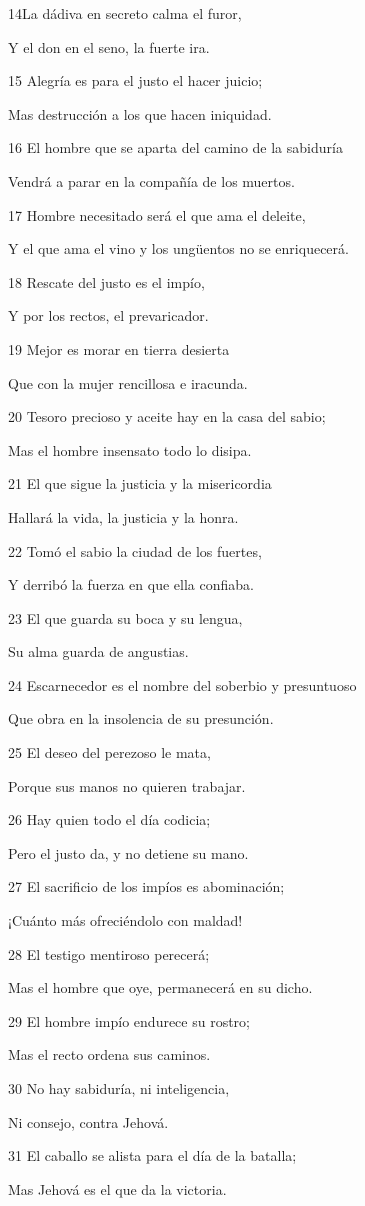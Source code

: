 \par 14La dádiva en secreto calma el furor,
\par Y el don en el seno, la fuerte ira.
\par 15 Alegría es para el justo el hacer juicio;
\par Mas destrucción a los que hacen iniquidad.
\par 16 El hombre que se aparta del camino de la sabiduría
\par Vendrá a parar en la compañía de los muertos.
\par 17 Hombre necesitado será el que ama el deleite,
\par Y el que ama el vino y los ungüentos no se enriquecerá. 
\par 18 Rescate del justo es el impío,
\par Y por los rectos, el prevaricador.
\par 19 Mejor es morar en tierra desierta
\par Que con la mujer rencillosa e iracunda.
\par 20 Tesoro precioso y aceite hay en la casa del sabio;
\par Mas el hombre insensato todo lo disipa.
\par 21 El que sigue la justicia y la misericordia
\par Hallará la vida, la justicia y la honra.
\par 22 Tomó el sabio la ciudad de los fuertes,
\par Y derribó la fuerza en que ella confiaba.
\par 23 El que guarda su boca y su lengua,
\par Su alma guarda de angustias.
\par 24 Escarnecedor es el nombre del soberbio y presuntuoso
\par Que obra en la insolencia de su presunción. 
\par 25 El deseo del perezoso le mata,
\par Porque sus manos no quieren trabajar.
\par 26 Hay quien todo el día codicia;
\par Pero el justo da, y no detiene su mano.
\par 27 El sacrificio de los impíos es abominación;
\par ¡Cuánto más ofreciéndolo con maldad!
\par 28 El testigo mentiroso perecerá;
\par Mas el hombre que oye, permanecerá en su dicho.
\par 29 El hombre impío endurece su rostro;
\par Mas el recto ordena sus caminos.
\par 30 No hay sabiduría, ni inteligencia,
\par Ni consejo, contra Jehová.
\par 31 El caballo se alista para el día de la batalla;
\par Mas Jehová es el que da la victoria.


